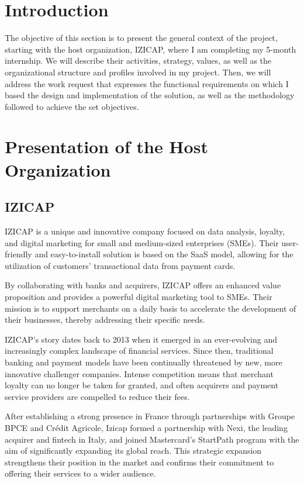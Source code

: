 \section{Introduction}
The objective of this section is to present the general context of the project, starting with the host organization, IZICAP, where I am completing my 5-month internship. We will describe their activities, strategy, values, as well as the organizational structure and profiles involved in my project. Then, we will address the work request that expresses the functional requirements on which I based the design and implementation of the solution, as well as the methodology followed to achieve the set objectives.

\section{Presentation of the Host Organization}
\subsection{IZICAP}
IZICAP is a unique and innovative company focused on data analysis, loyalty, and digital marketing for small and medium-sized enterprises (SMEs). Their user-friendly and easy-to-install solution is based on the SaaS model, allowing for the utilization of customers' transactional data from payment cards.

By collaborating with banks and acquirers, IZICAP offers an enhanced value proposition and provides a powerful digital marketing tool to SMEs. Their mission is to support merchants on a daily basis to accelerate the development of their businesses, thereby addressing their specific needs.

IZICAP's story dates back to 2013 when it emerged in an ever-evolving and increasingly complex landscape of financial services. Since then, traditional banking and payment models have been continually threatened by new, more innovative challenger companies. Intense competition means that merchant loyalty can no longer be taken for granted, and often acquirers and payment service providers are compelled to reduce their fees.

After establishing a strong presence in France through partnerships with Groupe BPCE and Crédit Agricole, Izicap formed a partnership with Nexi, the leading acquirer and fintech in Italy, and joined Mastercard's StartPath program with the aim of significantly expanding its global reach. This strategic expansion strengthens their position in the market and confirms their commitment to offering their services to a wider audience.

